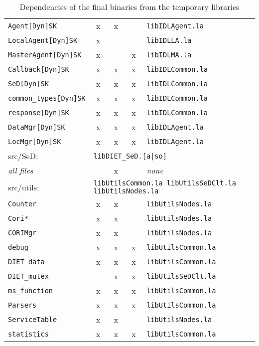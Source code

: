 \begin{table}[h]
\begin{tabular}[c]{|l|c|c|c|l|}
  \texttt{Agent[Dyn]SK}           & x & x &   & \texttt{libIDLAgent.la}\\
  \texttt{LocalAgent[Dyn]SK}      & x &   &   & \texttt{libIDLLA.la}\\
  \texttt{MasterAgent[Dyn]SK}     & x &   & x & \texttt{libIDLMA.la}\\
  \texttt{Callback[Dyn]SK}        & x & x & x & \texttt{libIDLCommon.la}\\
  \texttt{SeD[Dyn]SK}             & x & x & x & \texttt{libIDLCommon.la}\\
  \texttt{common\_types[Dyn]SK}   & x & x & x & \texttt{libIDLCommon.la}\\
  \texttt{response[Dyn]SK}        & x & x & x & \texttt{libIDLCommon.la}\\
  \texttt{DataMgr[Dyn]SK}        & x & x & x & \texttt{libIDLAgent.la}\\
  \texttt{LocMgr[Dyn]SK}        & x & x & x & \texttt{libIDLAgent.la}\\[5pt]
  \hline


  \multicolumn{1}{|l}{\textsf{src/SeD}:} &
  \multicolumn{4}{l|}{\texttt{libDIET\_SeD.[a|so]}}\\[5pt]

  \textit{all files}              &   & x &   & \emph{none}\\[5pt]
  \hline


  \multicolumn{1}{|l}{\textsf{src/utils}:} &
  \multicolumn{4}{l|}{\texttt{libUtilsCommon.la
                             libUtilsSeDClt.la  libUtilsNodes.la}}\\[5pt]

  \texttt{Counter}                & x & x &   & \texttt{libUtilsNodes.la}\\
  \texttt{Cori*}                  & x & x &   & \texttt{libUtilsNodes.la}\\
  \texttt{CORIMgr}                & x & x &   & \texttt{libUtilsNodes.la}\\
  \texttt{debug}                  & x & x & x & \texttt{libUtilsCommon.la}\\
  \texttt{DIET\_data}             & x & x & x & \texttt{libUtilsCommon.la}\\
  \texttt{DIET\_mutex}            &   & x & x & \texttt{libUtilsSeDClt.la}\\
  \texttt{ms\_function}           & x & x & x & \texttt{libUtilsCommon.la}\\
  \texttt{Parsers}                & x & x & x & \texttt{libUtilsCommon.la}\\
  \texttt{ServiceTable}           & x & x &   & \texttt{libUtilsNodes.la}\\
  \texttt{statistics}             & x & x & x & \texttt{libUtilsCommon.la}\\[5pt]
  \hline


 \end{tabular}
 \caption{Dependencies of the final binaries from the temporary
 libraries}
 \label{t:dep}
\end{table}


